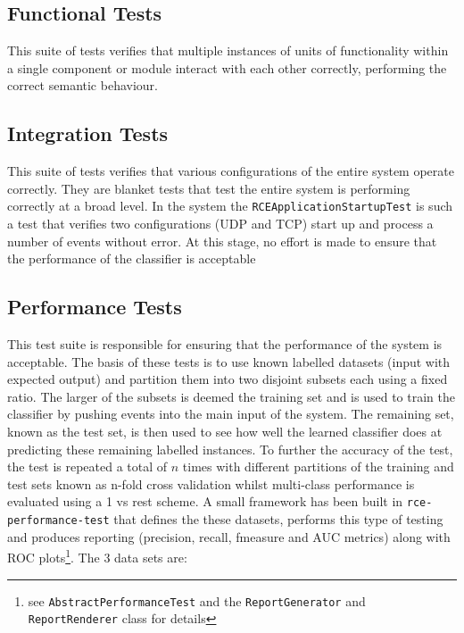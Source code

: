 \documentclass[a4paper,11pt]{scrreprt}
\begin{document}
\subsection{Functional Tests}
This suite of tests verifies that multiple instances of units of functionality within a single component or module interact with each other correctly, performing the correct semantic behaviour.
\subsection{Integration Tests}
This suite of tests verifies that various configurations of the entire system operate correctly. They are blanket tests that test the entire system is performing correctly at a broad level. In the system the \verb|RCEApplicationStartupTest| is such a test that verifies two configurations (UDP and TCP) start up and process a number of events without error. At this stage, no effort is made to ensure that the performance of the classifier is acceptable
\subsection{Performance Tests}
This test suite is responsible for ensuring that the performance of the system is acceptable. The basis of these tests is to use known labelled datasets (input with expected output) and partition them into two disjoint subsets each using a fixed ratio. The larger of the subsets is deemed the training set and is used to train the classifier by pushing events into the main input of the system. The remaining set, known as the test set, is then used to see how well the learned classifier does at predicting these remaining labelled instances. To further the accuracy of the test, the test is repeated a total of \(n\) times with different partitions of the training and test sets known as n-fold cross validation whilst multi-class performance is evaluated using a 1 vs rest scheme. A small framework has been built in \verb|rce-performance-test| that defines the these datasets, performs this type of testing and produces reporting (precision, recall, fmeasure and AUC metrics) along with ROC plots\footnote{see \verb|AbstractPerformanceTest| and the \verb|ReportGenerator| and \verb|ReportRenderer| class for details}. The 3 data sets are:
\end{document}

